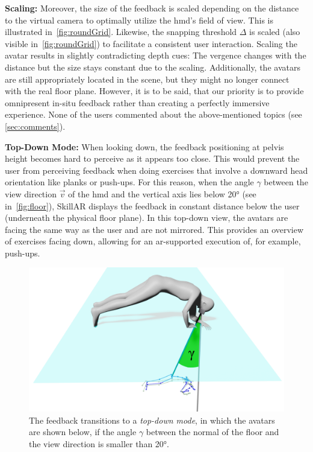\textbf{Scaling:}
Moreover, the size of the feedback is scaled depending on the distance to the virtual camera to optimally utilize the \acrshort{hmd}'s field of view.  This is illustrated in~\autoref{fig:roundGrid}. Likewise, the snapping threshold $\Delta$ is scaled (also visible in~\autoref{fig:roundGrid}) to facilitate a consistent user interaction. Scaling the avatar results in slightly contradicting depth cues: The vergence changes with the distance but the size stays constant due to the scaling. Additionally, the avatars are still appropriately located in the scene, but they might no longer connect with the real floor plane. However, it is to be said, that our priority is to provide omnipresent in-situ feedback rather than creating a perfectly immersive experience. None of the users commented about the above-mentioned topics (see \autoref{sec:comments}).

\textbf{Top-Down Mode:}
When looking down, the feedback positioning at pelvis height becomes hard to perceive as it appears too close. This would prevent the user from perceiving feedback when doing exercises that involve a downward head orientation like planks or push-ups. For this reason, when the angle $\gamma$ between the view direction $\vec{v}$ of the \acrshort{hmd} and the vertical axis lies below 20° (see in~\autoref{fig:floor}), SkillAR displays the feedback in constant distance below the user (underneath the physical floor plane). In this top-down view, the avatars are facing the same way as the user and are not mirrored. This provides an overview of exercises facing down, allowing for an \acrshort{ar}-supported execution of, for example, push-ups.

\begin{figure}[h!]
	\centering
	\includegraphics[width=0.6\linewidth]{pictures/floorPos.png}
	\caption[Top-down mode visualizing exercises when looking down.]{The feedback transitions to a \emph{top-down mode}, in which the avatars are shown below, if the angle $\gamma$ between the normal of the floor and the view direction is smaller than 20°. \label{fig:floor}}
\end{figure}

